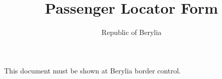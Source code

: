 \documentclass{article}
\begin{document}
\title{Passenger Locator Form}
\author{Republic of Berylia}

\maketitle

This document must be shown at Berylia border control.

\vspace{1.5cm}
\end{document}
